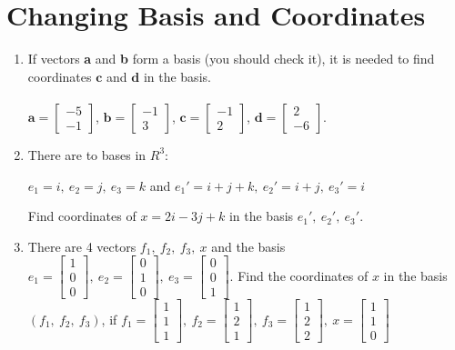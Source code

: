 \documentclass[a4paper,10pt]{article}
\begin{document}
\section{Changing Basis and Coordinates}
\begin{enumerate}
\item If vectors \textbf{a} and \textbf{b} form a basis (you should check it), it is needed to find coordinates $\textbf{c}$ and $\textbf{d}$ in the basis.\\\\
$\textbf{a}=\begin{bmatrix} -5 \\ -1 \end{bmatrix}$, $\textbf{b}=\begin{bmatrix} -1 \\ 3\end{bmatrix}$, 
$\textbf{c}=\begin{bmatrix} -1 \\ 2 \end{bmatrix}$, 
$\textbf{d}=\begin{bmatrix} 2 \\ -6\end{bmatrix}$.
\item There are to bases in $R^3$:

$e_1=i,\ e_2=j,\ e_3=k$ and $e_1'=i+j+k,\ e_2'=i+j,\ e_3'=i$

Find coordinates of $x=2i-3j+k$ in the basis $e_1',\ e_2',\ e_3'$.

\item

There are 4 vectors $f_1,\ f_2,\ f_3,\ x$ and the basis \\ $e_1=\begin{bmatrix}1\\0\\0\end{bmatrix},\ e_2=\begin{bmatrix}0\\1\\0\end{bmatrix},\ e_3=\begin{bmatrix}0\\0\\1\end{bmatrix}$. Find the coordinates of $x$ in the basis $(f_1,\ f_2,\ f_3)$, if $f_1=\begin{bmatrix}1\\1\\1\end{bmatrix},\ f_2=\begin{bmatrix}1\\2\\1\end{bmatrix},\ f_3=\begin{bmatrix}1\\2\\2\end{bmatrix},\ x=\begin{bmatrix}1\\1\\0\end{bmatrix}$
\end{enumerate}
\end{document}
